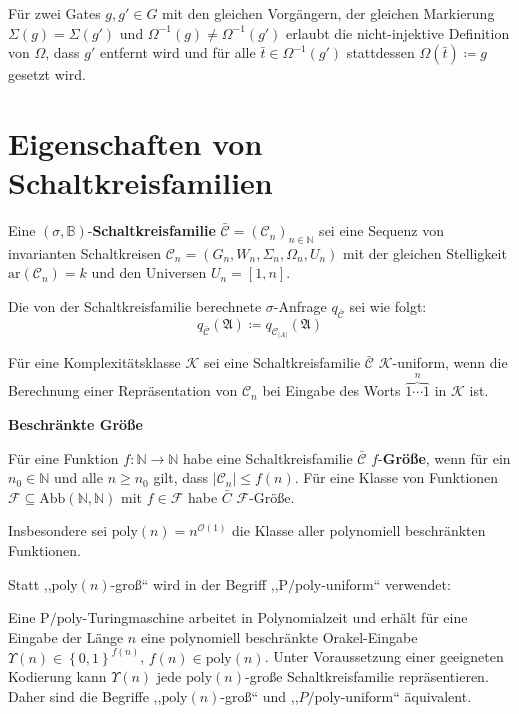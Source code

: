 Für zwei Gates $g,g'\in G$ mit den gleichen Vorgängern, der gleichen
Markierung $\Sigma\left(g\right)=\Sigma\left(g'\right)$ und $\Omega^{-1}\left(g\right)\neq\Omega^{-1}\left(g'\right)$
erlaubt die nicht-injektive Definition von $\Omega$, dass $g'$ entfernt
wird und für alle $\bar{t}\in\Omega^{-1}\left(g'\right)$ stattdessen
$\Omega\left(\bar{t}\right)\coloneqq g$ gesetzt wird.

\section{Eigenschaften von Schaltkreisfamilien}
\begin{defn}
Eine $\left(\sigma,\mathbb{B}\right)$-\textbf{Schaltkreisfamilie}
$\bar{\mathcal{C}}=\left(\mathcal{C}_{n}\right)_{n\in\mathbb{N}}$
sei eine Sequenz von invarianten Schaltkreisen $\mathcal{C}_{n}=\left(G_{n},W_{n},\Sigma_{n},\Omega_{n},U_{n}\right)$
mit der gleichen Stelligkeit $\mathrm{ar}\left(\mathcal{C}_{n}\right)=k$
und den Universen $U_{n}=\left[1,n\right]$.

Die von der Schaltkreisfamilie berechnete $\sigma$-Anfrage $q_{\bar{\mathcal{C}}}$
sei wie folgt: 
\[
q_{\bar{\mathcal{C}}}\left(\mathfrak{A}\right)\coloneqq q_{\mathcal{C}_{\left|A\right|}}\left(\mathfrak{A}\right)
\]
\end{defn}
%
\begin{defn}
Für eine Komplexitätsklasse $\mathcal{K}$ sei eine Schaltkreisfamilie
$\bar{\mathcal{C}}$ $\mathcal{K}$-uniform, wenn die Berechnung einer
Repräsentation von $\mathcal{C}_{n}$ bei Eingabe des Worts $\overset{n}{\overbrace{1\cdots1}}$
in $\mathcal{K}$ ist.
\end{defn}
%
\begin{defn}
\textbf{Beschränkte Größe}

Für eine Funktion $f:\mathbb{N}\rightarrow\mathbb{N}$ habe eine Schaltkreisfamilie
$\bar{\mathcal{C}}$ $f$-\textbf{Größe}, wenn für ein $n_{0}\in\mathbb{N}$
und alle $n\geqslant n_{0}$ gilt, dass $\left|\mathcal{C}_{n}\right|\leqslant f\left(n\right)$.
Für eine Klasse von Funktionen $\mathcal{F}\subseteq\mathrm{Abb}\left(\mathbb{N},\mathbb{N}\right)$
mit $f\in\mathcal{F}$ habe $\bar{C}$ $\mathcal{F}$-Größe.

Insbesondere sei $\mathrm{poly}\left(n\right)=n^{\mathcal{O}\left(1\right)}$
die Klasse aller polynomiell beschränkten Funktionen.
\end{defn}
\begin{rem*}
Statt ,,$\mathrm{poly}\left(n\right)$-groß`` wird in \cite{AD2014}
der Begriff ,,$\mathrm{P}/\mathrm{poly}$-uniform`` verwendet:

Eine $\mathrm{P/poly}$-Turingmaschine arbeitet in Polynomialzeit
und erhält für eine Eingabe der Länge $n$ eine polynomiell beschränkte
Orakel-Eingabe $\Upsilon\left(n\right)\in\left\{ 0,1\right\} ^{f\left(n\right)}$,
$f\left(n\right)\in\mathrm{poly}\left(n\right)$. Unter Voraussetzung
einer geeigneten Kodierung kann $\Upsilon\left(n\right)$ jede $\mathrm{poly}\left(n\right)$-große
Schaltkreisfamilie repräsentieren\cite{arora-barak}. Daher sind die
Begriffe ,,$\mathrm{poly}\left(n\right)$-groß`` und ,,$P/\mathrm{poly}$-uniform``
äquivalent.
\end{rem*}
